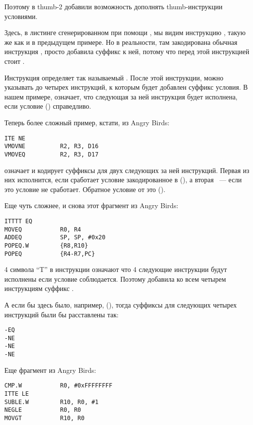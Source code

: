 Поэтому в thumb-2 добавили возможность дополнять thumb-инструкции условиями.

Здесь, в листинге сгенерированном при помощи \IDA, мы видим инструкцию , 
такую же как и в предыдущем
примере. Но в реальности, там закодирована обычная инструкция , просто \IDA добавила 
суффикс  к ней,
потому что перед этой инструкцией стоит .

Инструкция  определяет так называемый . После этой инструкции, можно указывать 
до четырех инструкций, к которым будет добавлен суффикс условия. В нашем примере,  означает,
что следующая за ней инструкция будет исполнена, если условие  () справедливо.

Теперь более сложный пример, кстати, из Angry Birds:

\begin{lstlisting}
ITE NE
VMOVNE          R2, R3, D16
VMOVEQ          R2, R3, D17
\end{lstlisting}

 означает  и кодирует суффиксы для двух следующих за ней инструкций. Первая из них
исполнится, если сработает условие закодированное в  (), а вторая ~--- 
если это условие не сработает. 
Обратное условие от  это  ().

Еще чуть сложнее, и снова этот фрагмент из Angry Birds:

\begin{lstlisting}
ITTTT EQ
MOVEQ           R0, R4
ADDEQ           SP, SP, #0x20
POPEQ.W         {R8,R10}
POPEQ           {R4-R7,PC}
\end{lstlisting}

4 символа ``T'' в инструкции означают что 4 следующие инструкции будут исполнены если условие соблюдается. 
Поэтому
\IDA добавила ко всем четырем инструкциям суффикс . 

А если бы здесь было, например,  (), 
тогда суффиксы для следующих четырех инструкций были бы расставлены так:

\begin{lstlisting}
-EQ
-NE
-NE
-NE
\end{lstlisting}

Еще фрагмент из Angry Birds:

\begin{lstlisting}
CMP.W           R0, #0xFFFFFFFF
ITTE LE
SUBLE.W         R10, R0, #1
NEGLE           R0, R0
MOVGT           R10, R0
\end{lstlisting}

